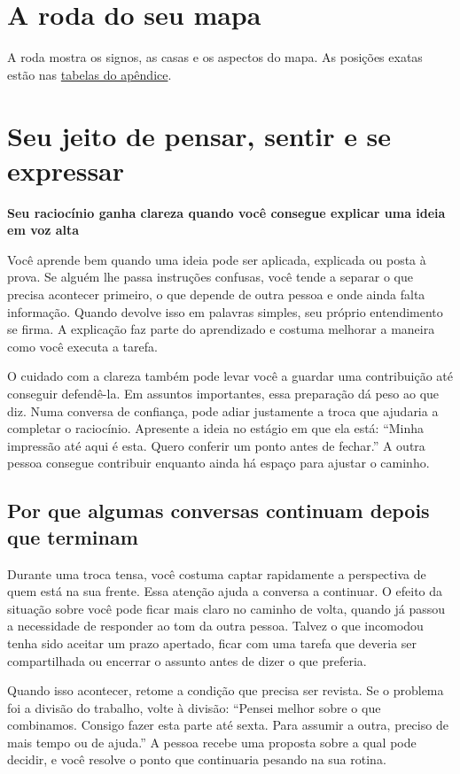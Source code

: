 \documentclass[11pt,a4paper]{article}
\newcommand{\subtituloleitura}[1]{\textbf{#1}\par\nopagebreak[4]}
\begin{document}
\section{A roda do seu mapa}
\begin{center}\NatalChartInternal\end{center}
A roda mostra os signos, as casas e os aspectos do mapa. As posições exatas estão nas \hyperref[tabelas-mapa]{tabelas do apêndice}.
\clearpage
\section{Seu jeito de pensar, sentir e se expressar}
\subtituloleitura{Seu raciocínio ganha clareza quando você consegue explicar uma ideia em voz alta}

Você aprende bem quando uma ideia pode ser aplicada, explicada ou posta à prova. Se alguém lhe passa instruções confusas, você tende a separar o que precisa acontecer primeiro, o que depende de outra pessoa e onde ainda falta informação. Quando devolve isso em palavras simples, seu próprio entendimento se firma. A explicação faz parte do aprendizado e costuma melhorar a maneira como você executa a tarefa.

O cuidado com a clareza também pode levar você a guardar uma contribuição até conseguir defendê-la. Em assuntos importantes, essa preparação dá peso ao que diz. Numa conversa de confiança, pode adiar justamente a troca que ajudaria a completar o raciocínio. Apresente a ideia no estágio em que ela está: “Minha impressão até aqui é esta. Quero conferir um ponto antes de fechar.” A outra pessoa consegue contribuir enquanto ainda há espaço para ajustar o caminho.

\subsection*{Por que algumas conversas continuam depois que terminam}

Durante uma troca tensa, você costuma captar rapidamente a perspectiva de quem está na sua frente. Essa atenção ajuda a conversa a continuar. O efeito da situação sobre você pode ficar mais claro no caminho de volta, quando já passou a necessidade de responder ao tom da outra pessoa. Talvez o que incomodou tenha sido aceitar um prazo apertado, ficar com uma tarefa que deveria ser compartilhada ou encerrar o assunto antes de dizer o que preferia.

Quando isso acontecer, retome a condição que precisa ser revista. Se o problema foi a divisão do trabalho, volte à divisão: “Pensei melhor sobre o que combinamos. Consigo fazer esta parte até sexta. Para assumir a outra, preciso de mais tempo ou de ajuda.” A pessoa recebe uma proposta sobre a qual pode decidir, e você resolve o ponto que continuaria pesando na sua rotina.
\end{document}
